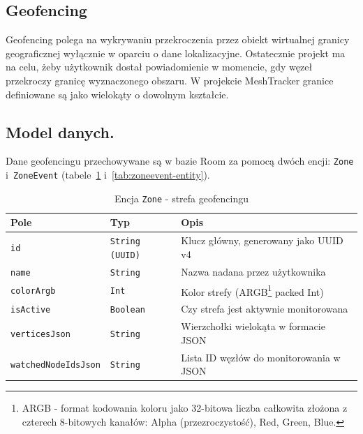 \subsection*{Geofencing}
\label{sec:geofencing}

Geofencing polega na wykrywaniu przekroczenia przez obiekt wirtualnej granicy
geograficznej wyłącznie w oparciu o dane lokalizacyjne. Ostatecznie projekt ma na celu,
żeby użytkownik dostał powiadomienie w momencie, gdy węzeł przekroczy granicę wyznaczonego 
obszaru. W projekcie MeshTracker granice definiowane są jako wielokąty o dowolnym kształcie.

\subsection*{Model danych.}

Dane geofencingu przechowywane są w bazie Room za pomocą dwóch encji:
\texttt{Zone} i~\texttt{ZoneEvent} (tabele~\ref{tab:zone-entity}
i~\ref{tab:zoneevent-entity}).

\begin{table}[!h]
    \caption{Encja \texttt{Zone} - strefa geofencingu}
    \label{tab:zone-entity}
    \centering
    \begin{tabular}{|l|l|p{7cm}|}
        \hline
        \textbf{Pole} & \textbf{Typ} & \textbf{Opis} \\
        \hline
        \texttt{id}                 & \texttt{String (UUID)} & Klucz główny, generowany jako UUID v4 \\
        \texttt{name}               & \texttt{String}        & Nazwa nadana przez użytkownika \\
        \texttt{colorArgb}          & \texttt{Int}           & Kolor strefy (ARGB\footnote{ARGB - format kodowania koloru jako 32-bitowa liczba całkowita złożona z czterech 8-bitowych kanałów: Alpha (przezroczystość), Red, Green, Blue.} packed Int) \\
        \texttt{isActive}           & \texttt{Boolean}       & Czy strefa jest aktywnie monitorowana \\
        \texttt{verticesJson}       & \texttt{String}        & Wierzchołki wielokąta w formacie JSON \\
        \texttt{watchedNodeIdsJson} & \texttt{String}        & Lista ID węzłów do monitorowania w JSON \\
        \hline
    \end{tabular}
\end{table}

